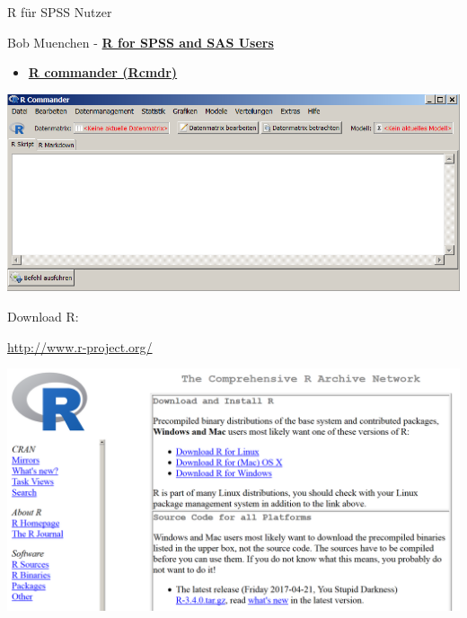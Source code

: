 \documentclass[ignorenonframetext,]{beamer}
\providecommand{\tightlist}{%
  \setlength{\itemsep}{0pt}\setlength{\parskip}{0pt}}
\begin{document}
\begin{frame}{R für SPSS Nutzer}
\protect\hypertarget{r-fur-spss-nutzer}{}

\begin{block}{Bob Muenchen -
\href{https://science.nature.nps.gov/im/datamgmt/statistics/r/documents/r_for_sas_spss_users.pdf}{\textbf{R
for SPSS and SAS Users }}}

\begin{itemize}
\tightlist
\item
  \href{http://www.rcommander.com/}{\textbf{R commander (Rcmdr)}}
\end{itemize}

\includegraphics{figure/Rcommanderex.PNG}

\end{block}

\end{frame}

\begin{frame}{Download R:}
\protect\hypertarget{download-r}{}

\url{http://www.r-project.org/}

\includegraphics{figure/CRAN1picture.PNG}

\end{frame}
\end{document}
